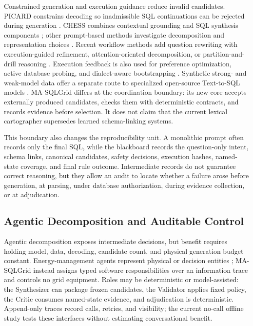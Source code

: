 \documentclass[applsci,article,submit,moreauthors]{Definitions/mdpi}
\newcommand{\masql}{MA-SQLGrid}
\begin{document}
Constrained generation and execution guidance reduce invalid candidates. PICARD constrains decoding so inadmissible SQL continuations can be rejected during generation \cite{scholak2021picard}. CHESS combines contextual grounding and SQL synthesis components \cite{talaei2024chess}; other prompt-based methods investigate decomposition and representation choices \cite{nan2023enhancing,sun2023sqlprompt,pourreza2023dinsql}. Recent workflow methods add question rewriting with execution-guided refinement, attention-oriented decomposition, or partition-and-drill reasoning \cite{mao2024dartsql,xie2024deasql,luo2024ptdsql}. Execution feedback is also used for preference optimization, active database probing, and dialect-aware bootstrapping \cite{zhai2025executionfeedback,xie2026sdesql,zhang2025exesql}. Synthetic strong- and weak-model data offer a separate route to specialized open-source Text-to-SQL models \cite{yang2024sense}. \masql{} differs at the coordination boundary: its new core accepts externally produced candidates, checks them with deterministic contracts, and records evidence before selection. It does not claim that the current lexical cartographer supersedes learned schema-linking systems.

This boundary also changes the reproducibility unit. A monolithic prompt often records only the final SQL, while the blackboard records the question-only intent, schema links, canonical candidates, safety decisions, execution hashes, named-state coverage, and final rule outcome. Intermediate records do not guarantee correct reasoning, but they allow an audit to locate whether a failure arose before generation, at parsing, under database authorization, during evidence collection, or at adjudication.

\subsection{Agentic Decomposition and Auditable Control}

Agentic decomposition exposes intermediate decisions, but benefit requires holding model, data, decoding, candidate count, and physical generation budget constant. Energy-management agents represent physical or decision entities \cite{dolinin2026multiagent}; \masql{} instead assigns typed software responsibilities over an information trace and controls no grid equipment. Roles may be deterministic or model-assisted: the Synthesizer can package frozen candidates, the Validator applies fixed policy, the Critic consumes named-state evidence, and adjudication is deterministic. Append-only traces record calls, retries, and visibility; the current no-call offline study tests these interfaces without estimating conversational benefit.
\end{document}
